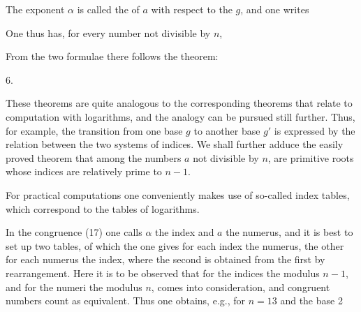 
The exponent $\alpha$ is called the  of $a$ with respect to the
 $g$, and one writes

One thus has, for every number not divisible by $n$,

From the two formulae
there follows the theorem:

6.\ 

These theorems are quite analogous to the corresponding theorems that
relate to computation with logarithms, and the analogy can be pursued
still further. Thus, for example, the transition from one base $g$ to
another base $g'$ is expressed by the relation
between the two systems of indices. We shall further adduce the easily proved theorem that among the
numbers $a$ not divisible by $n$,  are
primitive roots whose indices are relatively prime to $n-1$.

For practical computations one conveniently makes use of so-called
index tables, which correspond to the tables of logarithms.

In the congruence (17) one calls $\alpha$ the index and $a$ the numerus,
and it is best to set up two tables, of which the one gives for each
index the numerus, the other for each numerus the index, where the
second is obtained from the first by rearrangement. Here it is to be
observed that for the indices the modulus $n-1$, and for the numeri the
modulus $n$, comes into consideration, and congruent numbers count
as equivalent. Thus one obtains, e.g., for $n = 13$ and the base 2
